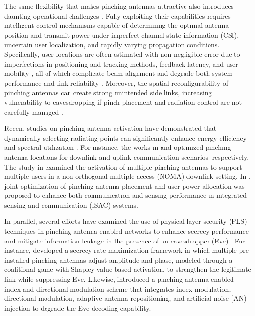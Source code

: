 \documentclass[journal,10pt]{IEEEtran}
\begin{document}
The same flexibility that makes pinching antennas attractive also introduces daunting operational challenges \cite{Singh2025}. Fully exploiting their capabilities requires intelligent control mechanisms capable of determining the optimal antenna position and transmit power under imperfect channel state information (CSI), uncertain user localization, and rapidly varying propagation conditions. Specifically, user locations are often estimated with non-negligible error due to imperfections in positioning and tracking methods, feedback latency, and user mobility \cite{10540175}, all of which complicate beam alignment and degrade both system performance and link reliability \cite{10287946}. Moreover, the spatial reconfigurability of pinching antennas can create strong unintended side links, increasing vulnerability to eavesdropping if pinch placement and radiation control are not carefully managed \cite{Zhu2025}. 


Recent studies on pinching antenna activation have demonstrated that dynamically selecting radiating points can significantly enhance energy efficiency and spectral utilization  \cite{Tyrovolas2025}. For instance,
the works in \cite{10896748} and \cite{Tegos2025} optimized pinching-antenna locations for downlink and uplink communication scenarios, respectively. The study in \cite{10912473} examined the activation of multiple pinching antennas to support multiple users in a non-orthogonal multiple access (NOMA) downlink setting. In \cite{Qin2025}, joint optimization of pinching-antenna placement and user power allocation was proposed to enhance both communication and sensing performance in integrated sensing and communication (ISAC) systems. 

In parallel, several efforts have examined the use of physical-layer security (PLS) techniques in pinching antenna-enabled networks to enhance secrecy performance and mitigate information leakage in the presence of an eavesdropper (Eve) \cite{papanikolaou2025}. For instance, \cite{Wang2025} developed a secrecy-rate maximization framework in which multiple pre-installed pinching antennas  adjust amplitude and phase, modeled through a coalitional game with Shapley-value-based activation, to strengthen the legitimate link while suppressing Eve. Likewise, \cite{11205176} introduced a pinching antenna-enabled index and directional modulation  scheme that integrates index modulation, directional modulation, adaptive antenna repositioning, and artificial-noise (AN) injection to degrade the Eve decoding capability.
\end{document}

